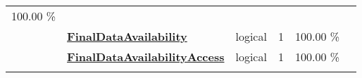 \documentclass[]{article}
\begin{document}
\begin{longtable}[]{@{}lllrcl@{}}
\begin{minipage}[t]{0.10\columnwidth}
100.00 \%\strut
\end{minipage} & \begin{minipage}[t]{0.12\columnwidth}\raggedright\strut
\strut
\end{minipage}\tabularnewline
\begin{minipage}[t]{0.07\columnwidth}\raggedright\strut
\strut
\end{minipage} & \begin{minipage}[t]{0.35\columnwidth}\raggedright\strut
\textbf{\protect\hyperlink{finaldataavailability}{FinalDataAvailability}}\strut
\end{minipage} & \begin{minipage}[t]{0.11\columnwidth}\raggedright\strut
logical\strut
\end{minipage} & \begin{minipage}[t]{0.10\columnwidth}\raggedleft\strut
1\strut
\end{minipage} & \begin{minipage}[t]{0.10\columnwidth}\centering\strut
100.00 \%\strut
\end{minipage} & \begin{minipage}[t]{0.12\columnwidth}\raggedright\strut
\strut
\end{minipage}\tabularnewline
\begin{minipage}[t]{0.07\columnwidth}\raggedright\strut
\strut
\end{minipage} & \begin{minipage}[t]{0.35\columnwidth}\raggedright\strut
\textbf{\protect\hyperlink{finaldataavailabilityaccess}{FinalDataAvailabilityAccess}}\strut
\end{minipage} & \begin{minipage}[t]{0.11\columnwidth}\raggedright\strut
logical\strut
\end{minipage} & \begin{minipage}[t]{0.10\columnwidth}\raggedleft\strut
1\strut
\end{minipage} & \begin{minipage}[t]{0.10\columnwidth}\centering\strut
100.00 \%\strut
\end{minipage} & \begin{minipage}[t]{0.12\columnwidth}\raggedright\strut
\strut
\end{minipage}\tabularnewline
\begin{minipage}[t]{0.07\columnwidth}\raggedright\strut
\strut
\end{minipage} & \begin{minipage}[t]{0.35\columnwidth}\raggedright\strut

\end{minipage}
\end{longtable}
\end{document}
